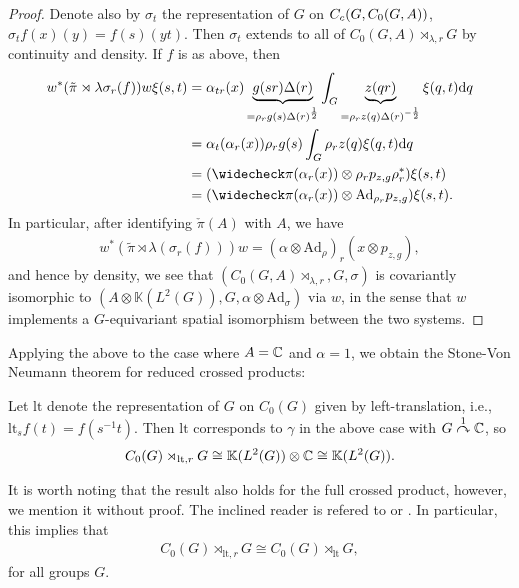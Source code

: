 \begin{proof}
Denote also by $\sigma_t$ the representation of $G$ on $C_c(G,C_0(G,A))$, $\sigma_t f(x)(y) = f(s)(yt)$. Then $\sigma_t$ extends to all of $C_0(G,A) \rtimes_{\lambda, r}G$ by continuity and density. If $f$ is as above, then
\begin{align*}
	w^* (\tilde \pi \rtimes \lambda \sigma_r (f) )w \xi(s,t) &= \alpha_{tr}(x)\underbrace{g(sr) \Delta(r)}_{= \rho_r g(s) \Delta(r) ^{\frac12}} \int_G \underbrace{z(qr)}_{= \rho_{r}z(q) \Delta(r)^{-\frac12}} \xi(q,t) \d q\\
	&= \alpha_{t} ( \alpha_r(x)) \rho_{r} g(s) \int_G \rho_r z(q) \xi(q,t) \d q\\ 
	&= ( \check \pi(\alpha_r(x)) \otimes \rho_r p_{z,g} \rho_{r}^*) \xi(s,t)\\
	&= ( \check \pi(\alpha_r(x)) \otimes \mathrm{Ad}_{\rho_r}p_{z,g}) \xi(s,t).
\end{align*}
In particular, after identifying $\check \pi (A) $ with $A$, we have
\begin{align*}
	w^* (\tilde \pi \rtimes \lambda(\sigma_r(f)))w = (\alpha \otimes \mathrm{Ad}_{\rho})_r(x \otimes p_{z,g}),
\end{align*}
and hence by density, we see that $(C_0(G,A) \rtimes_{\lambda , r}, G , \sigma)$ is covariantly isomorphic to $(A \otimes \mathbb{K}(L^2(G)), G, \alpha \otimes \mathrm{Ad}_{\sigma})$ via $w$, in the sense that $w$ implements a $G$-equivariant spatial isomorphism between the two systems. 
\end{proof}
Applying the above to the case where $A = \mathbb{C}$ and $\alpha = 1$, we obtain the Stone-Von Neumann theorem for reduced crossed products:
\begin{corollary}
Let $\mathrm{lt}$ denote the representation of $G$ on $C_0(G)$ given by left-translation, i.e., $\mathrm{lt}_s f(t) = f(s^{-1}t)$. Then $\mathrm{lt}$ corresponds to $\gamma$ in the above case with $G \stackrel{1}{\curvearrowright} \mathbb{C}$, so
\begin{align*}
	C_0(G) \rtimes_{\mathrm{lt},r} G \cong \mathbb{K}(L^2(G)) \otimes \mathbb{C} \cong \mathbb{K}(L^2(G)).
\end{align*}
\end{corollary}
It is worth noting that the result also holds for the full crossed product, however, we mention it without proof. The inclined reader is refered to \cite[Theorem 4.24]{williamscrossed} or \cite[§C.6 ]{williamsmorita}. In particular, this implies that
\begin{align*}
C_0(G) \rtimes_{\mathrm{lt},r} G \cong C_0(G) \rtimes_{\mathrm{lt}}G,
\end{align*}
for all groups $G$.

